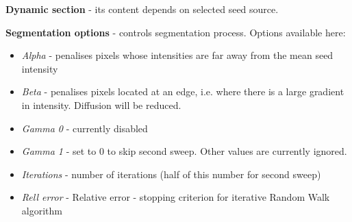 \documentclass[a4paper,12pt]{article}
\begin{document}
\textbf{Dynamic section} - its content depends on selected seed source.

\textbf{Segmentation options} - controls segmentation process. Options available here:
\begin{itemize}
	\item \textit{Alpha} - penalises pixels whose intensities are far away from the mean seed intensity
	\item \textit{Beta} - penalises pixels located at an edge, i.e. where there is a large gradient in intensity. Diffusion will be reduced.
	\item \textit{Gamma 0} - currently disabled
	\item \textit{Gamma 1} - set to 0 to skip second sweep. Other values are currently ignored.
	\item \textit{Iterations} - number of iterations (half of this number for second sweep)
	\item \textit{Rell error} - Relative error - stopping criterion for iterative Random Walk algorithm 
\end{itemize}
\end{document}
